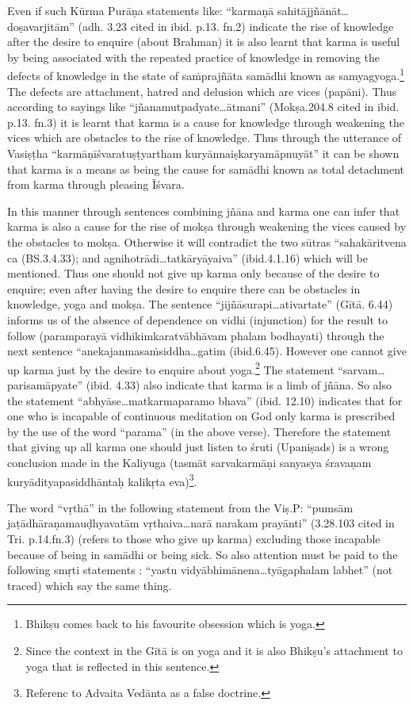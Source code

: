 Even if such Kūrma Purāṇa statements like: “karmaṇā sahitājjñānāt…\-doṣavarjitām” (adh. 3.23 cited in ibid. p.13. fn.2) indicate the rise of knowledge after the desire to enquire (about Brahman) it is also learnt that karma is useful by being associated with the repeated practice of knowledge in removing the defects of knowledge in the state of saṁprajñāta samādhi known as samyagyoga.\footnote{Bhikṣu comes back to his favourite obsession which is yoga.} The defects are attachment, hatred and delusion which are vices (papāni). Thus according to sayings like “jñanamutpadyate…ātmani” (Mokṣa.204.8 cited in ibid. p.13. fn.3) it is learnt that karma is a cause for knowledge through weakening the vices which are obstacles to the rise of knowledge. Thus through the utterance of Vasiṣṭha “karmāṇīśvaratuṣṭyartham kuryānnaiṣkaryamāpnuyāt” it can be shown that karma is a means as being the cause for samādhi known as total detachment from karma through pleasing Īśvara.

In this manner through sentences combining jñāna and karma one can infer that karma is also a cause for the rise of mokṣa through weakening the vices caused by the obstacles to mokṣa. Otherwise it will contradict the two sūtras “sahakāritvena ca (BS.3.4.33); and agnihotrādi…tatkāryāyaiva” (ibid.4.1.16) which will be mentioned. Thus one should not give up karma only because of the desire to enquire; even after having the desire to enquire there can be obstacles in knowledge, yoga and mokṣa. The sentence “jijñāsurapi…ativartate” (Gītā. 6.44) informs us of the absence of dependence on vidhi (injunction) for the result to follow (paramparayā vidhikimkaratvābhāvam phalam bodhayati) through the next sentence “anekajanmasaṁsiddha…gatim (ibid.6.45). However one cannot give up karma just by the desire to enquire about yoga.\footnote{Since the context in the Gītā is on yoga and it is also Bhikṣu’s attachment to yoga that is reflected in this sentence.} The statement “sarvam…parisamāpyate” (ibid. 4.33) also indicate that karma is a limb of jñāna. So also the statement “abhyāse…matkarmaparamo bhava” (ibid. 12.10) indicates that for one who is incapable of continuous meditation on God only karma is prescribed by the use of the word “parama” (in the above verse). Therefore the statement that giving up all karma one should just listen to śruti (Upaniṣads) is a wrong conclusion made in the Kaliyuga (tasmāt sarvakarmāṇi sanyasya śravaṇam kuryādityapasiddhāntaḥ kalikṛta eva)\footnote{Referenc to Advaita Vedānta as a false doctrine.}. 

The word “vṛthā” in the following statement from the Viṣ.P: “pumsām jaṭādhāraṇamauḍhyavatām vṛthaiva…narā narakam prayānti” (3.28.103 cited in Tri. p.14.fn.3) (refers to those who give up karma) excluding those incapable because of being in samādhi or being sick.  So also attention must be paid to the following smṛti statements : “yastu vidyābhimānena…tyāgaphalam labhet” (not traced) which say the same thing.

